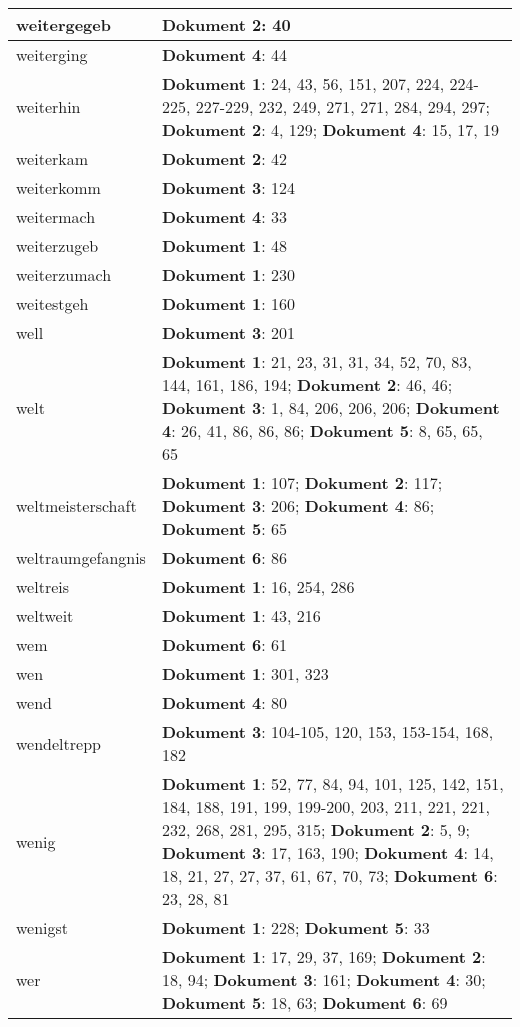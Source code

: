 \documentclass[a5paper]{article}
\begin{document}
\begin{longtable}[l]{|l|p{3in}|}
\hline
weitergegeb & \textbf{Dokument 2}: 40 \\
\hline
weiterging & \textbf{Dokument 4}: 44 \\
\hline
weiterhin & \textbf{Dokument 1}: 24, 43, 56, 151, 207, 224, 224-225, 227-229, 232, 249, 271, 271, 284, 294, 297; \textbf{Dokument 2}: 4, 129; \textbf{Dokument 4}: 15, 17, 19 \\
\hline
weiterkam & \textbf{Dokument 2}: 42 \\
\hline
weiterkomm & \textbf{Dokument 3}: 124 \\
\hline
weitermach & \textbf{Dokument 4}: 33 \\
\hline
weiterzugeb & \textbf{Dokument 1}: 48 \\
\hline
weiterzumach & \textbf{Dokument 1}: 230 \\
\hline
weitestgeh & \textbf{Dokument 1}: 160 \\
\hline
well & \textbf{Dokument 3}: 201 \\
\hline
welt & \textbf{Dokument 1}: 21, 23, 31, 31, 34, 52, 70, 83, 144, 161, 186, 194; \textbf{Dokument 2}: 46, 46; \textbf{Dokument 3}: 1, 84, 206, 206, 206; \textbf{Dokument 4}: 26, 41, 86, 86, 86; \textbf{Dokument 5}: 8, 65, 65, 65 \\
\hline
weltmeisterschaft & \textbf{Dokument 1}: 107; \textbf{Dokument 2}: 117; \textbf{Dokument 3}: 206; \textbf{Dokument 4}: 86; \textbf{Dokument 5}: 65 \\
\hline
weltraumgefangnis & \textbf{Dokument 6}: 86 \\
\hline
weltreis & \textbf{Dokument 1}: 16, 254, 286 \\
\hline
weltweit & \textbf{Dokument 1}: 43, 216 \\
\hline
wem & \textbf{Dokument 6}: 61 \\
\hline
wen & \textbf{Dokument 1}: 301, 323 \\
\hline
wend & \textbf{Dokument 4}: 80 \\
\hline
wendeltrepp & \textbf{Dokument 3}: 104-105, 120, 153, 153-154, 168, 182 \\
\hline
wenig & \textbf{Dokument 1}: 52, 77, 84, 94, 101, 125, 142, 151, 184, 188, 191, 199, 199-200, 203, 211, 221, 221, 232, 268, 281, 295, 315; \textbf{Dokument 2}: 5, 9; \textbf{Dokument 3}: 17, 163, 190; \textbf{Dokument 4}: 14, 18, 21, 27, 27, 37, 61, 67, 70, 73; \textbf{Dokument 6}: 23, 28, 81 \\
\hline
wenigst & \textbf{Dokument 1}: 228; \textbf{Dokument 5}: 33 \\
\hline
wer & \textbf{Dokument 1}: 17, 29, 37, 169; \textbf{Dokument 2}: 18, 94; \textbf{Dokument 3}: 161; \textbf{Dokument 4}: 30; \textbf{Dokument 5}: 18, 63; \textbf{Dokument 6}: 69 \\

\end{longtable}
\end{document}

